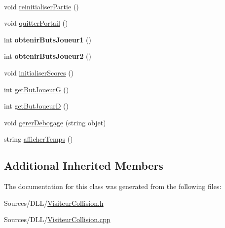 \begin{DoxyCompactItemize}
$$\item 
void \hyperlink{group__inf2990_ga1918900085adcd2403fc8832ca04ede0}{reinitialiser\+Partie} ()
\item 
void \hyperlink{group__inf2990_ga9c727900f93230caf0bb10740a8ebd90}{quitter\+Portail} ()
\item 
int {\bfseries obtenir\+Buts\+Joueur1} ()
\item 
int {\bfseries obtenir\+Buts\+Joueur2} ()
\item 
void \hyperlink{group__inf2990_ga7e38363f989b24004ce4baba0c913957}{initialiser\+Scores} ()
\item 
int \hyperlink{group__inf2990_gaba0f1d8a18ad4cd19521159a73929aed}{get\+But\+JoueurG} ()
\item 
int \hyperlink{group__inf2990_ga13802f6045d791037e456906fa19a9ba}{get\+But\+JoueurD} ()
\item 
void \hyperlink{group__inf2990_gab67aed0a6f062c2350eb6acc86f83508}{gerer\+Debogage} (string objet)
\item 
string \hyperlink{group__inf2990_gae73a54932abf5972890c4b7c3ccf47ae}{afficher\+Temps} ()
\end{DoxyCompactItemize}
\subsection*{Additional Inherited Members}


The documentation for this class was generated from the following files\+:\begin{DoxyCompactItemize}
\item 
Sources/\+D\+L\+L/\hyperlink{_visiteur_collision_8h}{Visiteur\+Collision.\+h}\item 
Sources/\+D\+L\+L/\hyperlink{_visiteur_collision_8cpp}{Visiteur\+Collision.\+cpp}\end{DoxyCompactItemize}
